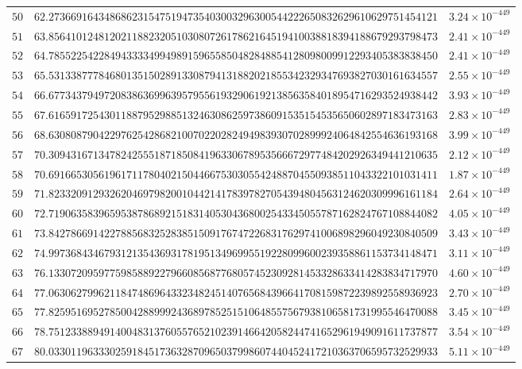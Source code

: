 \documentclass[12pt,reqno]{amsart}
\theoremstyle{remark}
\begin{document}
\begin{longtable}{clc}
$50$ & $62.2736691643486862315475194735403003296300544222650832629610629751454121$ & $3.24\times 10^{-449}$ \\
$51$ & $63.8564101248120211882320510308072617862164519410038818394188679293798473$ & $2.41\times 10^{-449}$ \\
$52$ & $64.7855225422849433334994989159655850482848854128098009912293405383838450$ & $2.41\times 10^{-449}$ \\
$53$ & $65.5313387778468013515028913308794131882021855342329347693827030161634557$ & $2.55\times 10^{-449}$ \\
$54$ & $66.6773437949720838636996395795561932906192138563584018954716293524938442$ & $3.93\times 10^{-449}$ \\
$55$ & $67.6165917254301188795298851324630862597386091535154535650602897183473163$ & $2.83\times 10^{-449}$ \\
$56$ & $68.6308087904229762542868210070220282494983930702899924064842554636193168$ & $3.99\times 10^{-449}$ \\
$57$ & $70.3094316713478242555187185084196330678953566672977484202926349441210635$ & $2.12\times 10^{-449}$ \\
$58$ & $70.6916653056196171178040215044667530305542488704550938511043322101031411$ & $1.87\times 10^{-449}$ \\
$59$ & $71.8233209129326204697982001044214178397827054394804563124620309996161184$ & $2.64\times 10^{-449}$ \\
$60$ & $72.7190635839659538786892151831405304368002543345055787162824767108844082$ & $4.05\times 10^{-449}$ \\
$61$ & $73.8427866914227885683252838515091767472268317629741006898296049230840509$ & $3.43\times 10^{-449}$ \\
$62$ & $74.9973684346793121354369317819513496995519228099600239358861153734148471$ & $3.11\times 10^{-449}$ \\
$63$ & $76.1330720959775985889227966085687768057452309281453328633414283834717970$ & $4.60\times 10^{-449}$ \\
$64$ & $77.0630627996211847486964332348245140765684396641708159872239892558936923$ & $2.70\times 10^{-449}$ \\
$65$ & $77.8259516952785004288999243689785251510648557567938106581731995546470088$ & $3.45\times 10^{-449}$ \\
$66$ & $78.7512338894914004831376055765210239146642058244741652961949091611737877$ & $3.54\times 10^{-449}$ \\
$67$ & $80.0330119633302591845173632870965037998607440452417210363706595732529933$ & $5.11\times 10^{-449}$ \\

\end{longtable}
\end{document}
